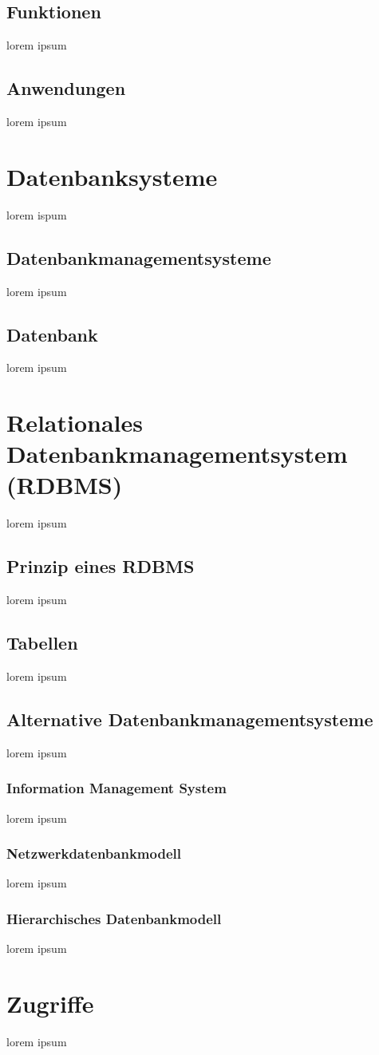 \documentclass[12pt,a4paper]{report}
\begin{document}
\subsection{Funktionen}
lorem ipsum
\subsection{Anwendungen}
lorem ipsum
\section{Datenbanksysteme}
lorem ispum
\subsection{Datenbankmanagementsysteme}
lorem ipsum
\subsection{Datenbank}
lorem ipsum
\section{Relationales Datenbankmanagementsystem (RDBMS)}
lorem ipsum
\subsection{Prinzip eines RDBMS}
lorem ipsum
\subsection{Tabellen}
lorem ipsum
\subsection{Alternative Datenbankmanagementsysteme}
lorem ipsum
\subsubsection{Information Management System}
lorem ipsum
\subsubsection{Netzwerkdatenbankmodell}
lorem ipsum
\subsubsection{Hierarchisches Datenbankmodell}
lorem ipsum
\section{Zugriffe}
lorem ipsum
\end{document}
